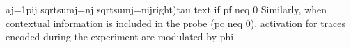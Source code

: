 {}\markdownRendererDollarSign{}\markdownRendererDollarSign{}a\markdownRendererLeftBrace{}j=1\markdownRendererRightBrace{}\markdownRendererLeftBrace{}p\markdownRendererLeftBrace{}ij\markdownRendererRightBrace{}\markdownRendererRightBrace{}\markdownRendererRightBrace{} \markdownRendererLeftBrace{}\markdownRendererBackslash{}sqrt\markdownRendererLeftBrace{}\markdownRendererBackslash{}sum\markdownRendererCircumflex{}\markdownRendererLeftBrace{}j=n\markdownRendererRightBrace{}j\markdownRendererRightBrace{}\markdownRendererRightBrace{} \markdownRendererBackslash{}sqrt\markdownRendererLeftBrace{}\markdownRendererBackslash{}sum\markdownRendererCircumflex{}\markdownRendererLeftBrace{}j=n\markdownRendererRightBrace{}\markdownRendererLeftBrace{}ij\markdownRendererRightBrace{}\markdownRendererRightBrace{}\markdownRendererRightBrace{}\markdownRendererRightBrace{}\markdownRendererRightBrace{}\markdownRendererBackslash{}right)\markdownRendererCircumflex{}\markdownRendererLeftBrace{}\markdownRendererBackslash{}tau\markdownRendererRightBrace{} \markdownRendererBackslash{}text\markdownRendererLeftBrace{} if \markdownRendererRightBrace{} p\markdownRendererUnderscore{}f \markdownRendererBackslash{}neq 0\markdownRendererDollarSign{}\markdownRendererDollarSign{}\markdownRendererInterblockSeparator
{}Similarly, when contextual information is included in the probe (\markdownRendererDollarSign{}p\markdownRendererUnderscore{}c \markdownRendererBackslash{}neq 0\markdownRendererDollarSign{}), activation for traces encoded during the experiment are modulated by \markdownRendererDollarSign{}\markdownRendererBackslash{}phi\markdownRendererDollarSign{}\markdownRendererInterblockSeparator
